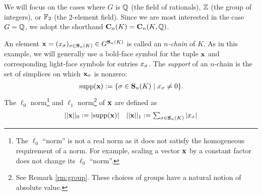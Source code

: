 \begin{remark}\label{rm:group}
We will focus on the cases where $G$ is $\mathbb{Q}$ (the field of rationals), $\mathbb{Z}$ (the group of integers), or $\mathbb{F}_2$ (the 2-element field).  Since we are most interested in the case $G = \mathbb{Q}$, we adopt the shorthand $\mathbf{C}_n(K) = \mathbf{C}_n(K,\mathbb{Q})$. 
\end{remark}

An element $\mathbf{x} = (x_\sigma)_{\sigma \in \mathbf{S}_n(K)} \in G^{\mathbf{S}_n(K)}$ is called an \emph{$n$-chain} of $K$.   As  in this example, we will generally use a bold-face symbol for the tuple $\mathbf{x}$ and corresponding light-face symbols for entries $x_\sigma$.  The \emph{support} of an $n$-chain is the set of simplices on which $\mathbf{x}_\sigma$ is nonzero:  
%
    \begin{align*}
        \mathrm{supp}(\mathbf{x})  :=\{ \sigma \in \mathbf{S}_n(K) \mid x_\sigma \neq 0 \}.
    \end{align*}
%
The $\ell_0$ norm\footnote{The $\ell_0$ ``norm'' is not a real norm as it does not satisfy the homogeneous requirement of a norm. For example, scaling a vector $\mathbf{x}$ by a constant factor does not change its $\ell_0$ ``norm''.} and  $\ell_1$ norm\footnote{ See Remark \ref{rm:group}. These choices of groups have a natural notion of absolute value.} of $\mathbf{x}$ are defined as 
    \begin{align*}
        ||\mathbf{x}||_0 := |\mathrm{supp}(\mathbf{x}) |
        &&
        \textstyle
        ||\mathbf{x}||_1 := \sum_{ \sigma \in \mathbf{S}_n(K)} | x_\sigma  |
    \end{align*}

